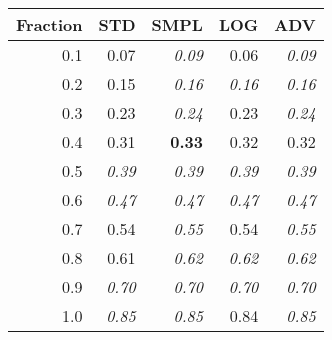 \documentclass{standalone}
\begin{document}
\begin{tabular}{r|rrrr}
      \toprule
      Fraction & STD & SMPL & LOG & ADV\\
      \midrule
      0.1 & 0.07 & \emph{0.09} & 0.06 & \emph{0.09}\\
  0.2 & 0.15 & \emph{0.16} & \emph{0.16} & \emph{0.16}\\
  0.3 & 0.23 & \emph{0.24} & 0.23 & \emph{0.24}\\
  0.4 & 0.31 & \textbf{0.33} & 0.32 & 0.32\\
  0.5 & \emph{0.39} & \emph{0.39} & \emph{0.39} & \emph{0.39}\\
  0.6 & \emph{0.47} & \emph{0.47} & \emph{0.47} & \emph{0.47}\\
  0.7 & 0.54 & \emph{0.55} & 0.54 & \emph{0.55}\\
  0.8 & 0.61 & \emph{0.62} & \emph{0.62} & \emph{0.62}\\
  0.9 & \emph{0.70} & \emph{0.70} & \emph{0.70} & \emph{0.70}\\
  1.0 & \emph{0.85} & \emph{0.85} & 0.84 & \emph{0.85}\\
  \bottomrule
\end{tabular}
\end{document}
